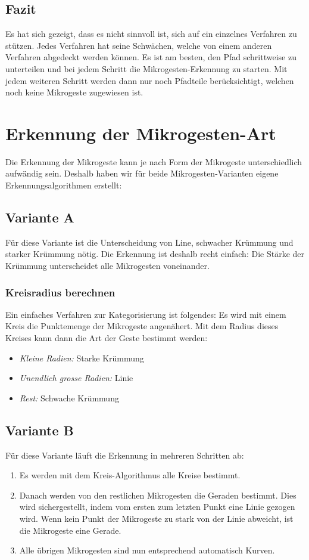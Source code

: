 \subsection{Fazit}
Es hat sich gezeigt, dass es nicht sinnvoll ist, sich auf ein einzelnes Verfahren zu stützen. Jedes Verfahren hat seine Schwächen, welche von einem anderen Verfahren abgedeckt werden können. Es ist am besten, den Pfad schrittweise zu unterteilen und bei jedem Schritt die Mikrogesten-Erkennung zu starten. Mit jedem weiteren Schritt werden dann nur noch Pfadteile berücksichtigt, welchen noch keine Mikrogeste zugewiesen ist.


\section{Erkennung der Mikrogesten-Art}
Die Erkennung der Mikrogeste kann je nach Form der Mikrogeste unterschiedlich aufwändig sein. Deshalb haben wir für beide Mikrogesten-Varianten eigene Erkennungsalgorithmen erstellt:

\subsection{Variante A}
Für diese Variante ist die Unterscheidung von Line, schwacher Krümmung und starker Krümmung nötig. Die Erkennung ist deshalb recht einfach: Die Stärke der Krümmung unterscheidet alle Mikrogesten voneinander.

\subsubsection{Kreisradius berechnen}
Ein einfaches Verfahren zur Kategorisierung ist folgendes: Es wird mit einem Kreis die Punktemenge der Mikrogeste angenähert. Mit dem Radius dieses Kreises kann dann die Art der Geste bestimmt werden:
\begin{itemize}
\item \emph{Kleine Radien:} Starke Krümmung
\item \emph{Unendlich grosse Radien:} Linie
\item \emph{Rest:} Schwache Krümmung
\end{itemize}

\subsection{Variante B}
Für diese Variante läuft die Erkennung in mehreren Schritten ab:
\begin{enumerate}
\item Es werden mit dem Kreis-Algorithmus alle Kreise bestimmt.
\item Danach werden von den restlichen Mikrogesten die Geraden bestimmt. Dies wird sichergestellt, indem vom ersten zum letzten Punkt eine Linie gezogen wird. Wenn kein Punkt der Mikrogeste zu stark von der Linie abweicht, ist die Mikrogeste eine Gerade.
\item Alle übrigen Mikrogesten sind nun entsprechend automatisch Kurven.
\end{enumerate}

